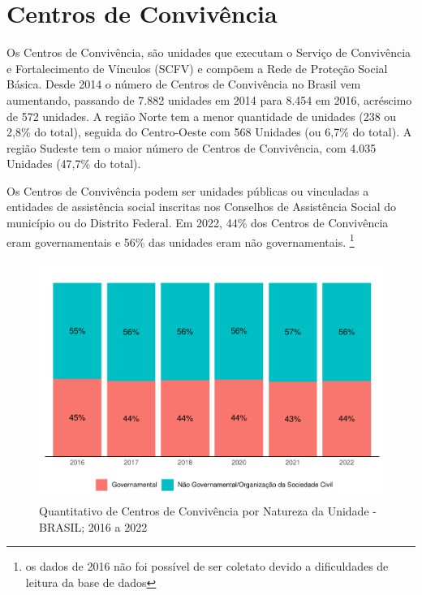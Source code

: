 \documentclass[
  brazilian]{report}
\begin{document}
\hypertarget{centros-de-convivuxeancia}{%
\section{Centros de Convivência}\label{centros-de-convivuxeancia}}

Os Centros de Convivência, são unidades que executam o Serviço de
Convivência e Fortalecimento de Vínculos (SCFV) e compõem a Rede de
Proteção Social Básica. Desde 2014 o número de Centros de Convivência no
Brasil vem aumentando, passando de 7.882 unidades em 2014 para 8.454 em
2016, acréscimo de 572 unidades. A região Norte tem a menor quantidade
de unidades (238 ou 2,8\% do total), seguida do Centro-Oeste com 568
Unidades (ou 6,7\% do total). A região Sudeste tem o maior número de
Centros de Convivência, com 4.035 Unidades (47,7\% do total).

Os Centros de Convivência podem ser unidades públicas ou vinculadas a
entidades de assistência social inscritas nos Conselhos de Assistência
Social do município ou do Distrito Federal. Em 2022, 44\% dos Centros de
Convivência eram governamentais e 56\% das unidades eram não
governamentais.
\footnote{os dados de 2016 não foi possível de ser coletato devido a dificuldades de leitura da base de dados}

\begin{figure}
\includegraphics{Censo-SUAS-2022_files/figure-latex/centro-conv-natureza-1} \caption[Quantitativo de Centros de Convivência por Natureza da Unidade - BRASIL]{Quantitativo de Centros de Convivência por Natureza da Unidade - BRASIL; 2016 a 2022}\label{fig:centro-conv-natureza}
\end{figure}
\end{document}

